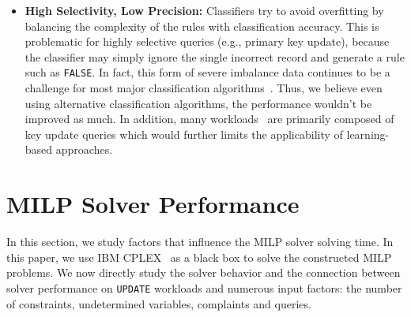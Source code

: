 \begin{itemize}[itemsep=1pt, leftmargin=5mm]
\item \textbf{High Selectivity, Low Precision: }
Classifiers try to avoid overfitting by balancing the complexity of the rules with classification accuracy.
This is problematic for highly selective queries (e.g., primary key update), because the classifier
may simply ignore the single incorrect record and generate a rule such as \texttt{FALSE}.
In fact, this form of severe imbalance data continues to be a challenge for most major classification algorithms~\cite{he2009learning, galar2012review}. 
Thus, we believe even using alternative classification algorithms, the performance wouldn't be improved as much. 
In addition, many workloads~\cite{oltpbench} are primarily composed of key update queries which would further limits the applicability of learning-based approaches.

\end{itemize}


% 





\section{MILP Solver Performance}
\label{app:solvtime}


In this section, we study factors that influence the MILP solver solving time. In this paper, we
use IBM CPLEX~\cite{cplex2014v12} as a black box to solve the constructed MILP problems. 
We now directly study the solver behavior and the connection between solver performance on \texttt{UPDATE} workloads and numerous
input factors: the number of constraints, undetermined variables, complaints and queries.

